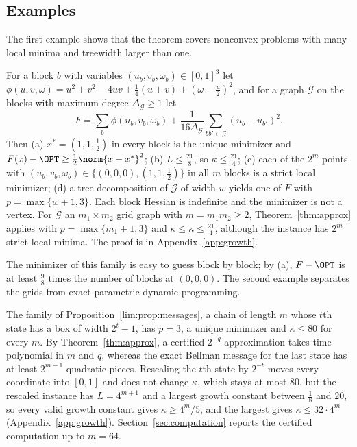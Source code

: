 

\subsection{Examples}
The first example shows that the theorem covers nonconvex problems with many
local minima and treewidth larger than one.

\begin{example}\label{ex:family}
For a block $b$ with variables $(u_b,v_b,\omega_b)\in[0,1]^3$ let
$\phi(u,v,\omega)=u^2+v^2-4uv+\frac14(u+v)+(\omega-\frac u2)^2$, and for a graph
$\mathcal G$ on the blocks with maximum degree $\Delta_{\mathcal G}\ge1$ let
\[
F=\sum_b\phi(u_b,v_b,\omega_b)+\frac1{16\Delta_{\mathcal G}}
\sum_{bb'\in\mathcal G}(u_b-u_{b'})^2 .
\]
Then (a) $x^*=(1,1,\frac12)$ in every block is the unique minimizer and
$F(x)-\OPT\ge\frac12\norm{x-x^*}^2$; (b) $L\le\frac{21}8$, so
$\kappa\le\frac{21}4$; (c) each of the $2^m$ points with
$(u_b,v_b,\omega_b)\in\{(0,0,0),(1,1,\frac12)\}$ in all $m$ blocks is a strict
local minimizer; (d) a tree decomposition of $\mathcal G$ of width $w$ yields
one of $F$ with $p=\max\{w+1,3\}$. Each block Hessian is indefinite and the
minimizer is not a vertex. For $\mathcal G$ an $m_1\times m_2$ grid graph
with $m=m_1m_2\ge2$, Theorem~\ref{thm:approx} applies with $p=\max\{m_1+1,3\}$ and
$\bar\kappa\le\kappa\le\frac{21}4$, although the instance has $2^m$ strict
local minima. The proof is in Appendix~\ref{app:growth}.
\end{example}

The minimizer of this family is easy to guess block by block; by (a),
$F-\OPT$ is at least $\frac98$ times the number of blocks at $(0,0,0)$. The
second example separates the grids from exact parametric dynamic
programming.

\begin{example}\label{ex:chain}
The family of Proposition~\ref{lim:prop:messages}, a chain of length $m$
whose $t$th state has a box of width $2^t-1$, has $p=3$, a unique minimizer
and $\kappa\le80$ for every $m$. By Theorem~\ref{thm:approx}, a certified
$2^{-q}$-approximation takes time polynomial in $m$ and $q$, whereas the
exact Bellman message for the last state has at least $2^{m-1}$ quadratic
pieces. Rescaling the $t$th state by $2^{-t}$ moves every coordinate into
$[0,1]$ and does not change $\bar\kappa$, which stays at most $80$, but the
rescaled instance has $L=4^{m+1}$ and a largest growth constant between
$\frac18$ and $20$, so every valid growth constant gives $\kappa\ge4^m/5$,
and the largest gives $\kappa\le32\cdot4^m$ (Appendix~\ref{app:growth}).
Section~\ref{sec:computation} reports the certified computation up to
$m=64$.
\end{example}
